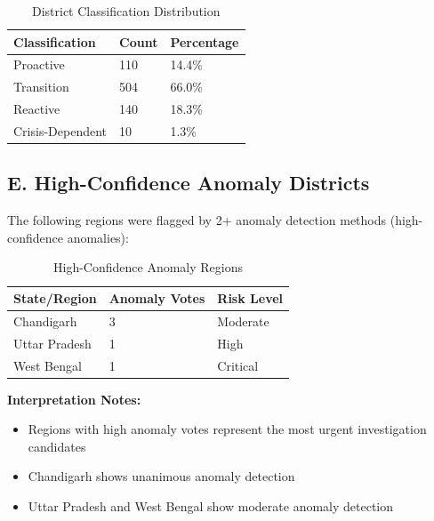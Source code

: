 \documentclass[11pt, a4paper]{article}
\begin{document}
\vspace{0.8em}
\begin{table}[H]
\caption{District Classification Distribution}
{\small
\begin{tabularx}{\textwidth}{|Y|Y|Y|}
\hline
\textbf{Classification} & \textbf{Count} & \textbf{Percentage} \\ \hline
Proactive & 110 & 14.4\% \\ \hline
Transition & 504 & 66.0\% \\ \hline
Reactive & 140 & 18.3\% \\ \hline
Crisis-Dependent & 10 & 1.3\% \\ \hline
\end{tabularx}
}
\end{table}
\vspace{1em}

\subsection{E. High-Confidence Anomaly Districts}

The following regions were flagged by 2+ anomaly detection methods (high-confidence anomalies):


\vspace{0.8em}
\begin{table}[H]
\caption{High-Confidence Anomaly Regions}
{\small
\begin{tabularx}{\textwidth}{|Y|Y|Y|}
\hline
\textbf{State/\allowbreak Region} & \textbf{Anomaly Votes} & \textbf{Risk Level} \\ \hline
Chandigarh & 3 & Moderate \\ \hline
Uttar Pradesh & 1 & High \\ \hline
West Bengal & 1 & Critical \\ \hline
\end{tabularx}
}
\end{table}
\vspace{1em}

\textbf{Interpretation Notes:}


\begin{itemize}
\item Regions with high anomaly votes represent the most urgent investigation candidates

\item Chandigarh shows unanimous anomaly detection

\item Uttar Pradesh and West Bengal show moderate anomaly detection
\end{itemize}
\end{document}
